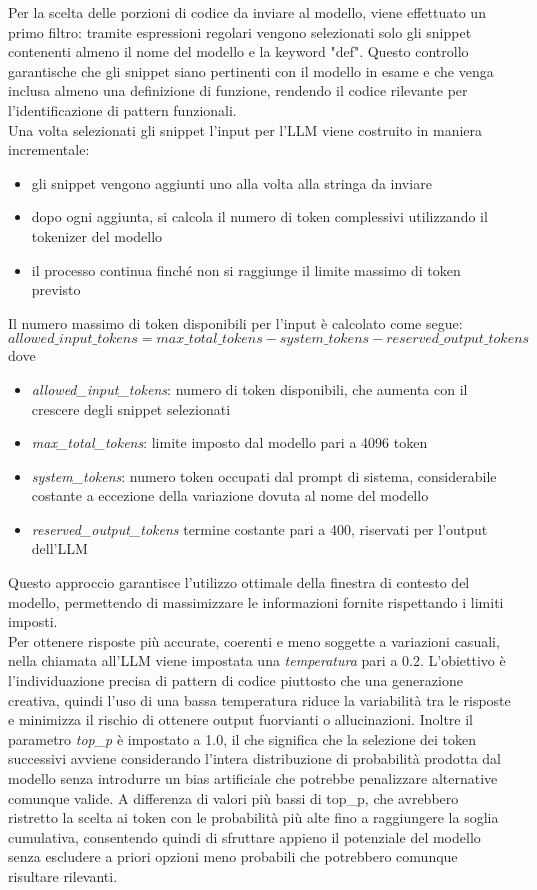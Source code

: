 \documentclass{article}
\begin{document}
Per la scelta delle porzioni di codice da inviare al modello, viene effettuato un primo filtro: tramite espressioni regolari vengono selezionati solo gli snippet contenenti almeno il nome del modello e la keyword "def". Questo controllo garantische che gli snippet siano pertinenti con il modello in esame e che venga inclusa almeno una definizione di funzione, rendendo il codice rilevante per l'identificazione di pattern funzionali.\\
Una volta selezionati gli snippet l'input per l'LLM viene costruito in maniera incrementale:
\begin{itemize}
    \item gli snippet vengono aggiunti uno alla volta alla stringa da inviare
    \item dopo ogni aggiunta, si calcola il numero di token complessivi utilizzando il tokenizer del modello
    \item il processo continua finché non si raggiunge il limite massimo di token previsto
\end{itemize}
Il numero massimo di token disponibili per l’input è calcolato come segue:
\[
allowed\_input\_tokens = max\_total\_tokens - system\_tokens - reserved\_output\_tokens
\]
dove
\begin{itemize}
    \item \textit{allowed\_input\_tokens}: numero di token disponibili, che aumenta con il crescere degli snippet selezionati
    \item \textit{max\_total\_tokens}: limite imposto dal modello pari a 4096 token
    \item \textit{system\_tokens}: numero token occupati dal prompt di sistema, considerabile costante a eccezione della variazione dovuta al nome del modello
    \item \textit{reserved\_output\_tokens} termine costante pari a 400,  riservati per l’output dell’LLM
\end{itemize}
Questo approccio garantisce l'utilizzo ottimale della finestra di contesto del modello, permettendo di massimizzare le informazioni fornite rispettando i limiti imposti.\\
Per ottenere risposte più accurate, coerenti e meno soggette a variazioni casuali, nella chiamata all'LLM viene impostata una \textit{temperatura} pari a 0.2. L'obiettivo è l’individuazione precisa di pattern di codice piuttosto che una generazione creativa, quindi l'uso di una bassa temperatura riduce la variabilità tra le risposte e minimizza il rischio di ottenere output fuorvianti o allucinazioni. Inoltre il parametro\textit{ top\_p} è impostato a 1.0, il che significa che la selezione dei token successivi avviene considerando l'intera distribuzione di probabilità prodotta dal modello senza introdurre un bias artificiale che potrebbe penalizzare alternative comunque valide. A differenza di valori più bassi di top\_p, che avrebbero ristretto la scelta ai token con le probabilità più alte fino a raggiungere la soglia cumulativa, consentendo quindi di sfruttare appieno il potenziale del modello senza escludere a priori opzioni meno probabili che potrebbero comunque risultare rilevanti.\\
\end{document}
